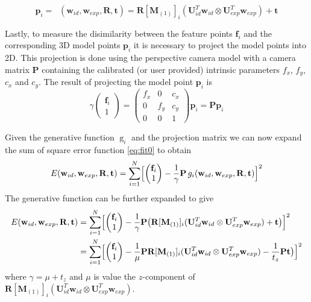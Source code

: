 \documentclass[11pt,a4paper]{report}
\begin{document}
\begin{equation}\label{eq:fit3}
\mathbf{p}_i = \mathop{g_i}(\mathbf{w}_{id},\mathbf{w}_{exp},\mathbf{R},\mathbf{t})
= \mathbf{R}[\mathbf{M}_{(1)}]_{i}(\mathbf{U}_{id}^T\mathbf{w}_{id} \otimes
\mathbf{U}_{exp}^T\mathbf{w}_{exp}) + \mathbf{t}
\end{equation}

Lastly, to measure the disimilarity between the feature points $\mathbf{f}_i$ and the
corresponding 3D model points $\mathbf{p}_i$ it is necessary to project the model points
into 2D. This projection is done using the perspective camera model with a camera matrix $\mathbf{P}$ containing the calibrated (or
user provided) intrinsic parameters $f_x$, $f_y$, $c_x$ and $c_y$. The result of
projecting the model point $\mathbf{p}_i$ is 
\begin{equation}\label{eq:fit5}
\gamma\begin{pmatrix}\mathbf{f}_i\\1\end{pmatrix}
= \begin{pmatrix}f_x&0&c_x\\0&f_y&c_y\\0&0&1\end{pmatrix}\mathbf{p}_i
    = \mathbf{P}\mathbf{p}_i
\end{equation}

Given the generative function $\mathop{g}_i$ and the projection matrix we can now expand the
sum of square error function \ref{eq:fit0} to obtain
\begin{equation}\label{eq:fit6}
E(\mathbf{w}_{id}, \mathbf{w}_{exp}, \mathbf{R}, \mathbf{t}) = \sum_{i=1}^N \Bigl[\begin{pmatrix}\mathbf{f}_i\\1\end{pmatrix} - \frac{1}{\gamma}\mathbf{P}\mathop{g_i}(\mathbf{w}_{id},\mathbf{w}_{exp},\mathbf{R},\mathbf{t})\Bigl]^2
\end{equation}
The generative function can be further expanded to give
\begin{align}\label{eq:fit7}
E(\mathbf{w}_{id}, \mathbf{w}_{exp}, \mathbf{R}, \mathbf{t}) &= \sum_{i=1}^N \Bigl[\begin{pmatrix}\mathbf{f}_i\\1\end{pmatrix} - \frac{1}{\gamma}\mathbf{P}\bigr(\mathbf{R}[\mathbf{M}_{(1)}]_{i}(\mathbf{U}_{id}^T\mathbf{w}_{id} \otimes
\mathbf{U}_{exp}^T\mathbf{w}_{exp}) + \mathbf{t}\bigl)\Bigl]^2\\\label{eq:fit8}
&=\sum_{i=1}^N \Bigl[\begin{pmatrix}\mathbf{f}_i\\1\end{pmatrix} - \frac{1}{\mu}\mathbf{P}\mathbf{R}[\mathbf{M}_{(1)}]_{i}(\mathbf{U}_{id}^T\mathbf{w}_{id} \otimes
\mathbf{U}_{exp}^T\mathbf{w}_{exp}) - \frac{1}{t_z}\mathbf{P}\mathbf{t}\bigl)\Bigl]^2
\end{align}
where $\gamma = \mu + t_z$ and $\mu$ is value the $z$-component of $\mathbf{R}[\mathbf{M}_{(1)}]_{i}(\mathbf{U}_{id}^T\mathbf{w}_{id} \otimes
\mathbf{U}_{exp}^T\mathbf{w}_{exp})$.
\end{document}
